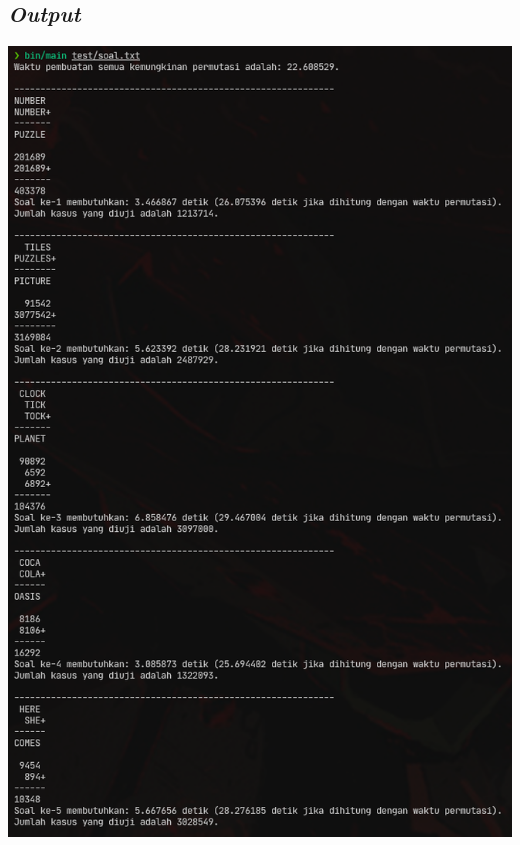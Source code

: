 \documentclass{article}
\let\origfigure\figure
\let\endorigfigure\endfigure
\renewenvironment{figure}[1][2] {
    \expandafter\origfigure\expandafter[H]
} {
    \endorigfigure
}
\begin{document}
\subsection{\textit{Output}}
\begin{figure}
  \includegraphics{stima-ss-1.png}
  \caption{Luaran program dekripsi untuk bagian permutasi dan soal 1 sampai 5}
\end{figure}
\end{document}
